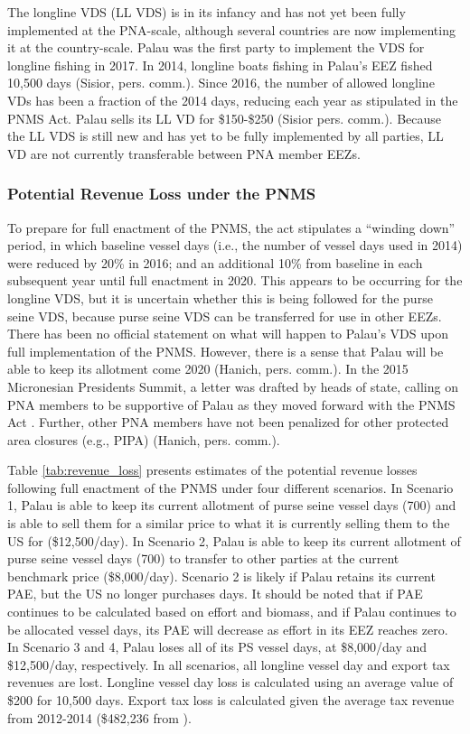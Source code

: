 \documentclass[9pttwoside,lineno]{pnas-new}
\begin{document}
The longline VDS (LL VDS) is in its infancy and has not yet been fully implemented at the PNA-scale, although several countries are now implementing it at the country-scale. Palau was the first party to implement the VDS for longline fishing in 2017. In 2014, longline boats fishing in Palau’s EEZ fished 10,500 days (Sisior, pers. comm.). Since 2016, the number of allowed longline VDs has been a fraction of the 2014 days, reducing each year as stipulated in the PNMS Act. Palau sells its LL VD for \$150-\$250 (Sisior pers. comm.). Because the LL VDS is still new and has yet to be fully implemented by all parties, LL VD are not currently transferable between PNA member EEZs. 


\subsubsection{Potential Revenue Loss under the PNMS}

To prepare for full enactment of the PNMS, the act stipulates a “winding down” period, in which baseline vessel days (i.e., the number of vessel days used in 2014) were reduced by 20\% in 2016; and an additional 10\% from baseline in each subsequent year until full enactment in 2020. This appears to be occurring for the longline VDS, but it is uncertain whether this is being followed for the purse seine VDS, because purse seine VDS can be transferred for use in other EEZs. There has been no official statement on what will happen to Palau’s VDS upon full implementation of the PNMS. However, there is a sense that Palau will be able to keep its allotment come 2020 (Hanich, pers. comm.). In the 2015 Micronesian Presidents Summit, a letter was drafted by heads of state, calling on PNA members to be supportive of Palau as they moved forward with the PNMS Act \cite{Senase2015}. Further, other PNA members have not been penalized for other protected area closures (e.g., PIPA) (Hanich, pers. comm.).

Table \ref{tab:revenue_loss} presents estimates of the potential revenue losses following full enactment of the PNMS under four different scenarios. In Scenario 1, Palau is able to keep its current allotment of purse seine vessel days (700) and is able to sell them for a similar price to what it is currently selling them to the US for (\$12,500/day). In Scenario 2, Palau is able to keep its current allotment of purse seine vessel days (700) to transfer to other parties at the current benchmark price (\$8,000/day). Scenario 2 is likely if Palau retains its current PAE, but the US no longer purchases days.  It should be noted that if PAE continues to be calculated based on effort and biomass, and if Palau continues to be allocated vessel days, its PAE will decrease as effort in its EEZ reaches zero. In Scenario 3 and 4, Palau loses all of its PS vessel days, at \$8,000/day and \$12,500/day, respectively. In all scenarios, all longline vessel day and export tax revenues are lost. Longline vessel day loss is calculated using an average value of \$200 for 10,500 days. Export tax loss is calculated given the average tax revenue from 2012-2014 (\$482,236  from \cite{Gillett2016}). 
\end{document}
